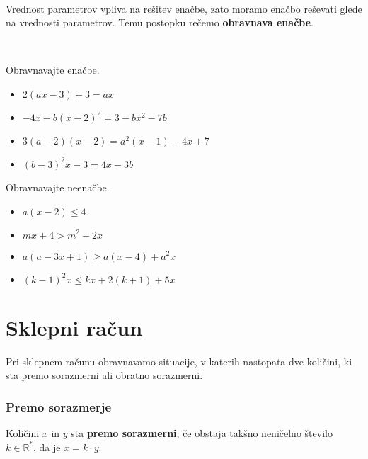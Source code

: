 ~
            
                Vrednost parametrov vpliva na rešitev enačbe, zato moramo enačbo reševati glede na vrednosti parametrov.
                Temu postopku rečemo \textbf{obravnava enačbe}.
            
        

~~~

        
            \begin{naloga}
                Obravnavajte enačbe.
                \begin{itemize}
                        \item $2(ax-3)+3=ax$ 
                        \item $-4x-b(x-2)^2=3-bx^2-7b$ 
                        \item $3(a-2)(x-2)=a^2(x-1)-4x+7$ 
                        \item $(b-3)^2x-3=4x-3b$ 
                \end{itemize}
            \end{naloga}
        

        
            \begin{naloga}
                Obravnavajte neenačbe.
                \begin{itemize}
                        \item $a(x-2)\leq 4$ 
                        \item $mx+4>m^2-2x$ 
                        \item $a(a-3x+1)\geq a(x-4)+a^2x$ 
                        \item $(k-1)^2x\leq kx+2(k+1)+5x$ 
                \end{itemize}
            \end{naloga}
        



\newpage

               
    \section{Sklepni račun}

    

        
            Pri sklepnem računu obravnavamo situacije, v katerih nastopata dve količini,
            ki sta premo sorazmerni ali obratno sorazmerni.
        

        \subsubsection*{Premo sorazmerje}
        Količini $x$ in $y$ sta \textbf{premo sorazmerni}, če obstaja takšno neničelno število $k\in\mathbb{R}^*$, da je $x=k\cdot y$.
        

